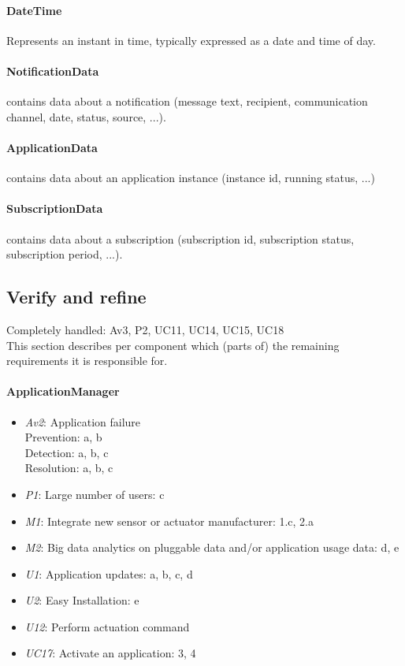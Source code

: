     \paragraph{DateTime} Represents an instant in time, typically expressed as a date and time of day.

    \paragraph{NotificationData} contains data about a notification (message text, recipient,
                                 communication channel, date, status, source, ...).

    \paragraph{ApplicationData} contains data about an application instance (instance id, running status, ...)
    \paragraph{SubscriptionData} contains data about a subscription (subscription id, subscription status,
                                 subscription period, ...).


\subsection{Verify and refine}
    Completely handled: Av3, P2, UC11, UC14, UC15, UC18 \\

    \noindent This section describes per component which (parts of) the remaining
    requirements it is responsible for.

    \paragraph{ApplicationManager}
        \begin{itemize}
            \item  \emph{Av2}: Application failure \\
                   Prevention: a, b \\
                   Detection: a, b, c \\
                   Resolution: a, b, c
           \item \emph{P1}: Large number of users: c
           \item \emph{M1}: Integrate new sensor or actuator manufacturer: 1.c, 2.a
           \item \emph{M2}: Big data analytics on pluggable data and/or application usage data: d, e
           \item \emph{U1}: Application updates: a, b, c, d
           \item \emph{U2}: Easy Installation: e
           \item \emph{U12}: Perform actuation command
           \item \emph{UC17}: Activate an application: 3, 4
        \end{itemize}

